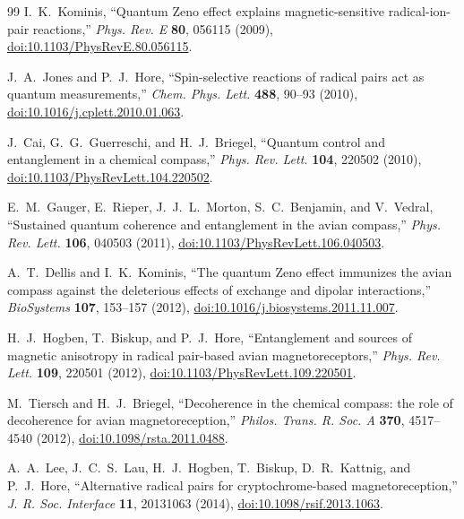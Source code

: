 \documentclass[twocolumn,10pt,amsmath,amssymb,floatfix]{revtex4-2}
\theoremstyle{plain}
\theoremstyle{definition}
\begin{document}
{\begin{thebibliography}{99}
I.~K.~Kominis,
``Quantum Zeno effect explains magnetic-sensitive radical-ion-pair reactions,''
\emph{Phys. Rev. E} \textbf{80}, 056115 (2009),
\href{https://doi.org/10.1103/PhysRevE.80.056115}{doi:10.1103/PhysRevE.80.056115}.

J.~A.~Jones and P.~J.~Hore,
``Spin-selective reactions of radical pairs act as quantum measurements,''
\emph{Chem. Phys. Lett.} \textbf{488}, 90--93 (2010),
\href{https://doi.org/10.1016/j.cplett.2010.01.063}{doi:10.1016/j.cplett.2010.01.063}.

J.~Cai, G.~G.~Guerreschi, and H.~J.~Briegel,
``Quantum control and entanglement in a chemical compass,''
\emph{Phys. Rev. Lett.} \textbf{104}, 220502 (2010),
\href{https://doi.org/10.1103/PhysRevLett.104.220502}{doi:10.1103/PhysRevLett.104.220502}.

E.~M.~Gauger, E.~Rieper, J.~J.~L.~Morton, S.~C.~Benjamin, and V.~Vedral,
``Sustained quantum coherence and entanglement in the avian compass,''
\emph{Phys. Rev. Lett.} \textbf{106}, 040503 (2011),
\href{https://doi.org/10.1103/PhysRevLett.106.040503}{doi:10.1103/PhysRevLett.106.040503}.

A.~T.~Dellis and I.~K.~Kominis,
``The quantum Zeno effect immunizes the avian compass against the deleterious effects of exchange and dipolar interactions,''
\emph{BioSystems} \textbf{107}, 153--157 (2012),
\href{https://doi.org/10.1016/j.biosystems.2011.11.007}{doi:10.1016/j.biosystems.2011.11.007}.

H.~J.~Hogben, T.~Biskup, and P.~J.~Hore,
``Entanglement and sources of magnetic anisotropy in radical pair-based avian magnetoreceptors,''
\emph{Phys. Rev. Lett.} \textbf{109}, 220501 (2012),
\href{https://doi.org/10.1103/PhysRevLett.109.220501}{doi:10.1103/PhysRevLett.109.220501}.

M.~Tiersch and H.~J.~Briegel,
``Decoherence in the chemical compass: the role of decoherence for avian magnetoreception,''
\emph{Philos. Trans. R. Soc. A} \textbf{370}, 4517--4540 (2012),
\href{https://doi.org/10.1098/rsta.2011.0488}{doi:10.1098/rsta.2011.0488}.

A.~A.~Lee, J.~C.~S.~Lau, H.~J.~Hogben, T.~Biskup, D.~R.~Kattnig, and P.~J.~Hore,
``Alternative radical pairs for cryptochrome-based magnetoreception,''
\emph{J. R. Soc. Interface} \textbf{11}, 20131063 (2014),
\href{https://doi.org/10.1098/rsif.2013.1063}{doi:10.1098/rsif.2013.1063}.


\end{thebibliography}}
\end{document}
